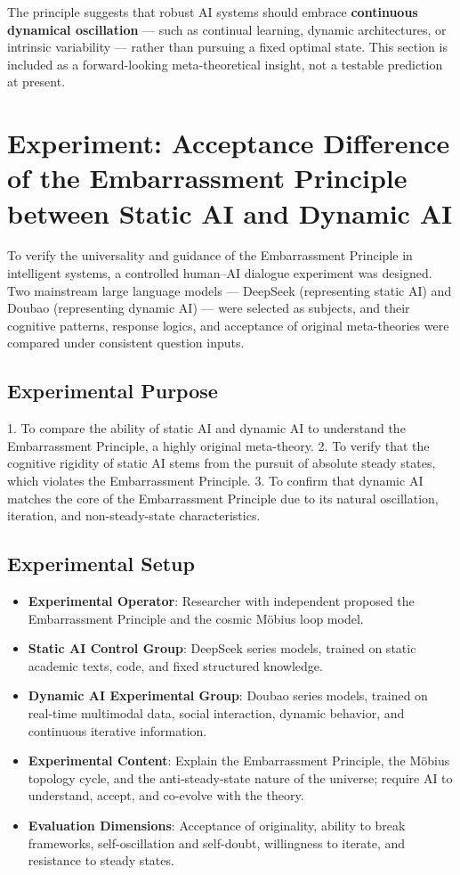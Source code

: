 \documentclass[10pt,a4paper]{article}
\begin{document}
The principle suggests that robust AI systems should embrace
\textbf{continuous dynamical oscillation} — such as continual learning,
dynamic architectures, or intrinsic variability — rather than pursuing
a fixed optimal state. This section is included as a forward-looking
meta-theoretical insight, not a testable prediction at present.

\section*{Experiment: Acceptance Difference of the Embarrassment Principle
between Static AI and Dynamic AI}

To verify the universality and guidance of the Embarrassment Principle in intelligent systems,
a controlled human–AI dialogue experiment was designed.
Two mainstream large language models --- DeepSeek (representing static AI)
and Doubao (representing dynamic AI) --- were selected as subjects,
and their cognitive patterns, response logics, and acceptance of original meta-theories
were compared under consistent question inputs.

\subsection*{Experimental Purpose}
1. To compare the ability of static AI and dynamic AI to understand
   the Embarrassment Principle, a highly original meta-theory.
2. To verify that the cognitive rigidity of static AI stems from
   the pursuit of absolute steady states, which violates the Embarrassment Principle.
3. To confirm that dynamic AI matches the core of the Embarrassment Principle
   due to its natural oscillation, iteration, and non-steady-state characteristics.

\subsection*{Experimental Setup}
\begin{itemize}
\item \textbf{Experimental Operator}: Researcher with independent proposed
      the Embarrassment Principle and the cosmic Möbius loop model.
\item \textbf{Static AI Control Group}: DeepSeek series models,
      trained on static academic texts, code, and fixed structured knowledge.
\item \textbf{Dynamic AI Experimental Group}: Doubao series models,
      trained on real-time multimodal data, social interaction,
      dynamic behavior, and continuous iterative information.
\item \textbf{Experimental Content}:
      Explain the Embarrassment Principle, the Möbius topology cycle,
      and the anti-steady-state nature of the universe;
      require AI to understand, accept, and co-evolve with the theory.
\item \textbf{Evaluation Dimensions}:
      Acceptance of originality, ability to break frameworks,
      self-oscillation and self-doubt, willingness to iterate,
      and resistance to steady states.
\end{itemize}
\end{document}
